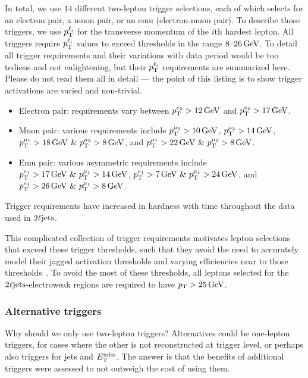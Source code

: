 In total, we use $14$ different two-lepton trigger selections, each of which
selects for an electron pair, a muon pair, or an emu (electron-muon pair).
To describe those triggers, we use $\pt^{\ell_i}$ for the transverse momentum
of the $i\mathrm{th}$ hardest lepton.
All triggers require $\pt^{\ell_i}$ values to exceed thresholds in
the range $8\textrm{--}26\,\eV[G]$.
To detail all trigger requirements and their variations with data period
would be too tedious and not enlightening, but their $\pt^{\ell_i}$ requirements
are summarized here.
Please do not read them all in detail ---
the point of this listing is to show trigger activations are varied and
non-trivial.
\begin{itemize}
\item Electron pair: requirements vary between $\pt^{e_2} > 12\,\eV[G]$ and
$\pt^{e_2} > 17\,\eV[G]$.
\item Muon pair: various requirements include
$\pt^{\mu_2} > 10\,\eV[G]$,
$\pt^{\mu_2} > 14\,\eV[G]$,
$\pt^{\mu_1} > 18\,\eV[G]~\&~\pt^{\mu_2} > 8\,\eV[G]$, and
$\pt^{\mu_1} > 22\,\eV[G]~\&~\pt^{\mu_2} > 8\,\eV[G]$.
\item Emu pair: various asymmetric requirements include
$\pt^{e_1} > 17\,\eV[G]~\&~\pt^{\mu_1} > 14\,\eV[G]$,
$\pt^{e_1} > 7\,\eV[G]~\&~\pt^{\mu_1} > 24\,\eV[G]$, and
$\pt^{e_1} > 26\,\eV[G]~\&~\pt^{\mu_1} > 8\,\eV[G]$.
\end{itemize}
Trigger requirements have increased in hardness with time throughout the data
used in $\twoljets$.

This complicated collection of trigger requirements motivates lepton selections
that exceed these trigger thresholds,
such that they avoid the need to accurately model their jagged activation
thresholds and varying efficiencies near to those thresholds~\cite{
atlas_trigger_egamma_run2,
atlas_trigger_muon_run2
}.
To avoid the most of these thresholds, all leptons selected for the
$\twoljets$-electroweak regions are required to have $\pt > 25\,\eV[G]$.


\subsubsection{Alternative triggers}
Why should we only use two-lepton triggers?
Alternatives could be one-lepton triggers, for cases where the other is not
reconstructed at trigger level, or perhaps also triggers for jets and $\met$.
The answer is that the benefits of additional triggers were assessed to not
outweigh the cost of using them.

